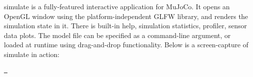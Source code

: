{\ttfamily simulate} is a fully-\/featured interactive application for Mu\+Jo\+Co. It opens an Open\+GL window using the platform-\/independent GLFW library, and renders the simulation state in it. There is built-\/in help, simulation statistics, profiler, sensor data plots. The model file can be specified as a command-\/line argument, or loaded at runtime using drag-\/and-\/drop functionality. Below is a screen-\/capture of simulate in action\+:

\href{https://youtu.be/0ORsj_E17B0}{\texttt{  }} 